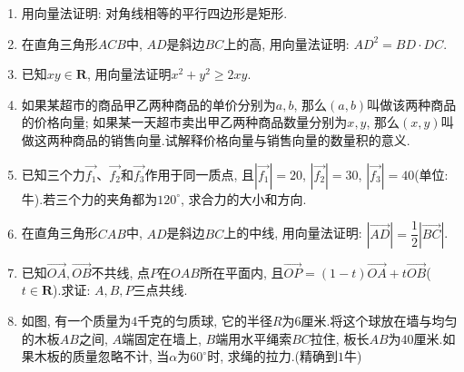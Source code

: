 \documentclass[10pt,a4paper]{article}
\begin{document}
\begin{enumerate}[1.]
\begin{center}
\begin{tikzpicture}[>=latex]
    \end{tikzpicture}
\end{center}
\item 用向量法证明: 对角线相等的平行四边形是矩形.
\item 在直角三角形$ACB$中, $AD$是斜边$BC$上的高, 用向量法证明: $AD^2=BD\cdot DC$.
\item 已知$xy\in \mathbf{R}$, 用向量法证明$x^2+y^2\ge 2xy$.
\item 如果某超市的商品甲乙两种商品的单价分别为$a,b$, 那么$(a,b)$叫做该两种商品的价格向量; 如果某一天超市卖出甲乙两种商品数量分别为$x,y$, 那么$(x,y)$叫做这两种商品的销售向量.试解释价格向量与销售向量的数量积的意义.
\item 已知三个力$\overrightarrow{f_1}$、$\overrightarrow{f_2}$和$\overrightarrow{f_3}$作用于同一质点, 且$|\overrightarrow{f_1}|=20$, $|\overrightarrow{f_2}|=30$, $|\overrightarrow{f_3}|=40$(单位: 牛).若三个力的夹角都为$120^{\circ }$, 求合力的大小和方向.
\begin{center}
\end{center}
\item 在直角三角形$CAB$中, $AD$是斜边$BC$上的中线, 用向量法证明: $|\overrightarrow{AD}|=\dfrac 12|\overrightarrow{BC}|$.
\item 已知$\overrightarrow{OA},\overrightarrow{OB}$不共线, 点$P$在$OAB$所在平面内, 且$\overrightarrow{OP}=(1-t)\overrightarrow{OA}+t\overrightarrow{OB}$($t\in \mathbf{R}$).求证: $A,B,P$三点共线.
\item 如图, 有一个质量为$4$千克的匀质球, 它的半径$R$为$6$厘米.将这个球放在墙与均匀的木板$AB$之间, $A$端固定在墙上, $B$端用水平绳索$BC$拉住, 板长$AB$为$40$厘米.如果木板的质量忽略不计, 当$\alpha$为$60^{\circ }$时, 求绳的拉力.(精确到$1$牛)
\begin{center}
\end{center}
\end{enumerate}
\end{document}
